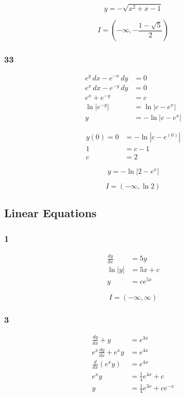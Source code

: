 \documentclass{article}
\begin{document}
\[y = -\sqrt{x^2 + x - 1}\]

\[I = \left( -\infty, -\frac{1 - \sqrt{5}}{2} \right)\]

\subsubsection{33}

\begin{align*}
  e^y \,d x - e^{-x} \,d y & = 0              \\
  e^x \,d x - e^{-y} \,d y & = 0              \\
  e^x + e^{-y}             & = c              \\
  \ln |e^{-y}|             & = \ln |c - e^x|  \\
  y                        & = -\ln |c - e^x|
\end{align*}

\begin{align*}
  y(0) = 0 & = -\ln |c - e^{(0)}| \\
  1        & = c - 1              \\
  c        & = 2
\end{align*}

\[y = -\ln |2 - e^x|\]

\[I = (-\infty, \ln 2)\]

\subsection{Linear Equations}

\subsubsection{1}

\begin{align*}
  \frac{d y}{d x} & = 5 y       \\
  \ln |y|         & = 5 x + c   \\
  y               & = c e^{5 x}
\end{align*}

\[I = (-\infty, \infty)\]

\subsubsection{3}

\begin{align*}
  \frac{d y}{d x} + y         & = e^{3 x}                        \\
  e^x \frac{d y}{d x} + e^x y & = e^{4 x}                        \\
  \frac{d}{d x} (e^x y)       & = e^{4 x}                        \\
  e^x y                       & = \frac{1}{4} e^{4 x} + c        \\
  y                           & = \frac{1}{4} e^{3 x} + c e^{-x}
\end{align*}
\end{document}
